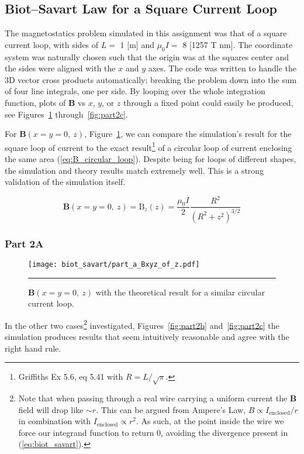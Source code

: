 \documentclass[notitlepage,aps,prd,nofootinbib]{revtex4-1}
\begin{document}
\clearpage
\subsection{Biot--Savart Law for a Square Current Loop}
\label{subsec:biot_savart_results}
The magnetostatics problem simulated in this assignment was that of a square current loop, with sides of $L =$ 1 [m] and $\mu_{0} I =$ 8 [1257 T nm]. The coordinate system was naturally chosen such that the origin was at the squares center and the sides were aligned with the $x$ and $y$ axes. The code was written to handle the 3D vector cross products automatically; breaking the problem down into the sum of four line integrals, one per side. By looping over the whole integration function, plots of $\mathbf{B}$ vs $x$, $y$, or $z$ through a fixed point could easily be produced, see Figures~\ref{fig:part2a} through~\ref{fig:part2c}.

For $\mathbf{B}\left(x=y=0,~z\right)$, Figure~\ref{fig:part2a}, we can compare the simulation's result for the square loop of current to the exact result\footnote{Griffiths Ex 5.6, eq 5.41 with $R = L/\sqrt{\pi}$.} of a circular loop of current enclosing the same area (\ref{eq:B_circular_loop}). Despite being for loops of different shapes, the simulation and theory results match extremely well. This is a strong validation of the simulation itself.

\begin{equation} \label{eq:B_circular_loop} 
\mathbf{B}\left(x=y=0,~z\right) = \mathrm{B}_{z}\left(z\right) = \frac{\mu_{0} I}{2} \frac{R^{2}}{\left(R^{2} + z^{2}\right)^{3/2}}
\end{equation}

\subsubsection{Part 2A}
\label{subsubsec:part_2a}

\begin{figure}[!htbc]
  \centering
  \texttt{[image: biot\_savart/part\_a\_Bxyz\_of\_z.pdf]}
	{\par\nobreak\rule[9pt]{35em}{0.5pt}\vspace{-5mm}}
	\caption{$\mathbf{B}\left(x=y=0,~z\right)$ with the theoretical result for a similar circular current loop.}
	\label{fig:part2a}
\end{figure}

In the other two cases\footnote{Note that when passing through a real wire carrying a uniform current the $\mathbf{B}$ field will drop like $\sim r$. This can be argued from Ampere's Law, $B \propto I_{\mathrm{enclosed}}/r$ in combination with $I_{\mathrm{enclosed}} \propto r^{2}$. As such, at the point inside the wire we force our integrand function to return 0, avoiding the divergence present in (\ref{eq:biot_savart}).} investigated, Figures~\ref{fig:part2b} and~\ref{fig:part2c} the simulation produces results that seem intuitively reasonable and agree with the right hand rule. 
\end{document}
